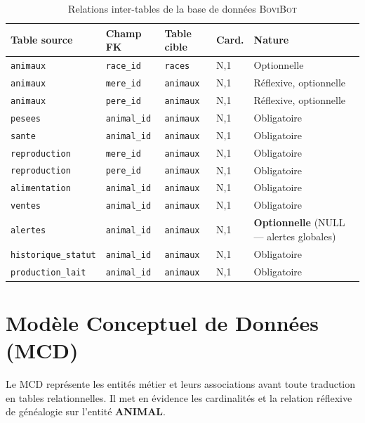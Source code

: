 \documentclass[12pt, a4paper, oneside]{report}
\newcommand{\bovirowcolors}{\rowcolors{2}{bovilight}{white}}
\newcommand{\bovibot}{\textsc{BoviBot}}
\begin{document}
\begin{table}[H]
\caption{Relations inter-tables de la base de données \bovibot{}}
\label{tab:relations}
\small\bovirowcolors
\begin{tabularx}{\textwidth}{@{}L{4cm}L{2.5cm}L{2.5cm}L{1.2cm}X@{}}
  \toprule
  \textbf{Table source} & \textbf{Champ FK} & \textbf{Table cible} & \textbf{Card.} & \textbf{Nature} \\
  \midrule
  \texttt{animaux}           & \texttt{race\_id}   & \texttt{races}   & N,1 & Optionnelle \\
  \texttt{animaux}           & \texttt{mere\_id}   & \texttt{animaux} & N,1 & Réflexive, optionnelle \\
  \texttt{animaux}           & \texttt{pere\_id}   & \texttt{animaux} & N,1 & Réflexive, optionnelle \\
  \texttt{pesees}            & \texttt{animal\_id} & \texttt{animaux} & N,1 & Obligatoire \\
  \texttt{sante}             & \texttt{animal\_id} & \texttt{animaux} & N,1 & Obligatoire \\
  \texttt{reproduction}      & \texttt{mere\_id}   & \texttt{animaux} & N,1 & Obligatoire \\
  \texttt{reproduction}      & \texttt{pere\_id}   & \texttt{animaux} & N,1 & Obligatoire \\
  \texttt{alimentation}      & \texttt{animal\_id} & \texttt{animaux} & N,1 & Obligatoire \\
  \texttt{ventes}            & \texttt{animal\_id} & \texttt{animaux} & N,1 & Obligatoire \\
  \texttt{alertes}           & \texttt{animal\_id} & \texttt{animaux} & N,1 & \textbf{Optionnelle} (NULL — alertes globales) \\
  \texttt{historique\_statut}& \texttt{animal\_id} & \texttt{animaux} & N,1 & Obligatoire \\
  \texttt{production\_lait}  & \texttt{animal\_id} & \texttt{animaux} & N,1 & Obligatoire \\
  \bottomrule
\end{tabularx}
\end{table}

\section{Modèle Conceptuel de Données (MCD)}

Le MCD représente les entités métier et leurs associations avant toute traduction en tables
relationnelles. Il met en évidence les cardinalités et la relation réflexive de généalogie
sur l'entité \textbf{ANIMAL}.
\end{document}
